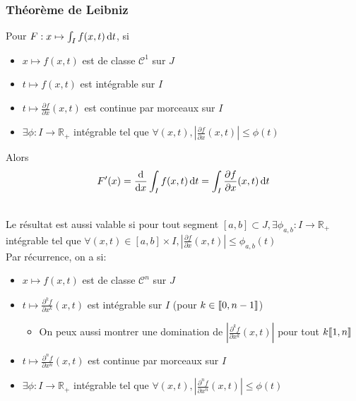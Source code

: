 \documentclass[openany]{book}
\begin{document}
\subsubsection{Théorème de Leibniz}
Pour $F : x \mapsto \int_{I} f(x, t) \, \text{d}t$, si
\begin{samepage}

\begin{itemize}
    \item $x \mapsto f(x, t)$ est de classe $\mathcal{C}^1$ sur $J$
    \item $t \mapsto f(x, t)$ est intégrable sur $I$
    \item $t \mapsto \frac{\partial f}{\partial x}(x, t)$ est continue par morceaux sur $I$
    \item $\exists \phi : I \rightarrow \mathbb{R}_+$ intégrable tel que $\forall (x, t), |\frac{\partial f}{\partial x}(x, t)| \leq \phi(t)$
\end{itemize}

Alors 
\[ F'(x) = \frac{\text{d}}{\text{d}x}\int_I f(x, t) \, \text{d}t = \int_I \frac{\partial f}{\partial x}(x, t) \, \text{d}t \]

\end{samepage} 

$ $ \\

Le résultat est aussi valable si pour tout segment $[a, b] \subset J, \exists \phi_{a, b} : I \rightarrow \mathbb{R}_+$ intégrable tel que $\forall (x, t) \in [a, b] \times I, |\frac{\partial f}{\partial x}(x, t)| \leq \phi_{a, b}(t)$ \\

Par récurrence, on a si:
\begin{itemize}
    \item $x \mapsto f(x, t)$ est de classe $\mathcal{C}^n$ sur $J$
    \item $t \mapsto \frac{\partial^k f}{\partial x^k}(x, t)$ est intégrable sur $I$ (pour $k \in \llbracket {0}, {n-1} \rrbracket$)
    \begin{itemize}
        \item On peux aussi montrer une domination de $|\frac{\partial^k f}{\partial x^k}(x, t)|$ pour tout $k \llbracket {1}, {n} \rrbracket$
    \end{itemize}
    \item $t \mapsto \frac{\partial^n f}{\partial x^n}(x, t)$ est continue par morceaux sur $I$
    \item $\exists \phi : I \rightarrow \mathbb{R}_+$ intégrable tel que $\forall (x, t), |\frac{\partial^n f}{\partial x^n}(x, t)| \leq \phi(t)$
\end{itemize}
\end{document}

